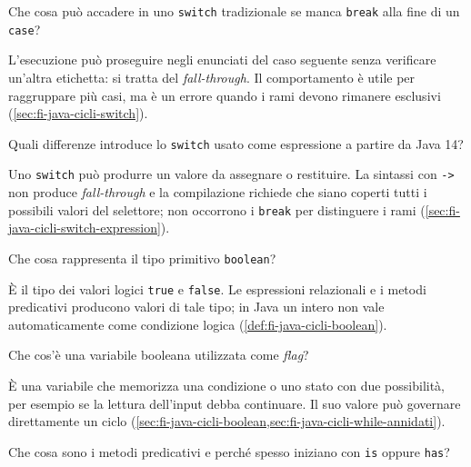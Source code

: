 \begin{exercise}
\label{ex:fi-esercizi-java-cicli-fallthrough}
Che cosa può accadere in uno \texttt{switch} tradizionale
se manca \texttt{break} alla fine di un \texttt{case}?
\end{exercise}

L'esecuzione può proseguire negli enunciati del caso seguente
senza verificare un'altra etichetta: si tratta del
\emph{fall-through}. Il comportamento è utile per raggruppare
più casi, ma è un errore quando i rami devono rimanere esclusivi
(\cref{sec:fi-java-cicli-switch}).

\begin{exercise}
\label{ex:fi-esercizi-java-cicli-switch-expression}
Quali differenze introduce lo \texttt{switch} usato come
espressione a partire da Java 14?
\end{exercise}

Uno \texttt{switch} può produrre un valore da assegnare o
restituire. La sintassi con \texttt{->} non produce
\emph{fall-through} e la compilazione richiede che siano coperti
tutti i possibili valori del selettore; non occorrono i
\texttt{break} per distinguere i rami
(\cref{sec:fi-java-cicli-switch-expression}).

\begin{exercise}
\label{ex:fi-esercizi-java-cicli-boolean}
Che cosa rappresenta il tipo primitivo \texttt{boolean}?
\end{exercise}

È il tipo dei valori logici \texttt{true} e \texttt{false}.
Le espressioni relazionali e i metodi predicativi producono
valori di tale tipo; in Java un intero non vale automaticamente
come condizione logica
(\cref{def:fi-java-cicli-boolean}).

\begin{exercise}
\label{ex:fi-esercizi-java-cicli-flag}
Che cos'è una variabile booleana utilizzata come \emph{flag}?
\end{exercise}

È una variabile che memorizza una condizione o uno stato con due
possibilità, per esempio se la lettura dell'input debba
continuare. Il suo valore può governare direttamente un ciclo
(\cref{sec:fi-java-cicli-boolean,sec:fi-java-cicli-while-annidati}).

\begin{exercise}
\label{ex:fi-esercizi-java-cicli-predicativi}
Che cosa sono i metodi predicativi e perché spesso iniziano
con \texttt{is} oppure \texttt{has}?
\end{exercise}

